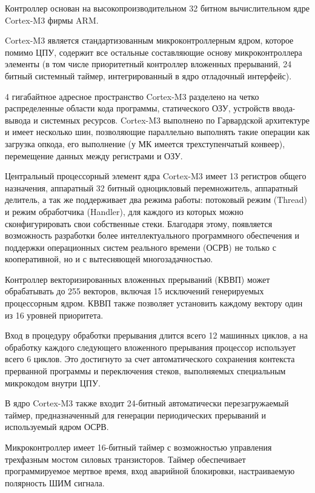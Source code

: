         Контроллер основан на высокопроизводительном 32 битном вычислительном
        ядре Cortex-M3 фирмы ARM.

        Cortex-M3 является стандартизованным микроконтроллерным ядром, которое
        помимо ЦПУ, содержит все остальные составляющие основу микроконтроллера
        элементы (в том числе приоритетный контроллер вложенных прерываний, 24
        битный системный таймер, интегрированный в ядро отладочный интерфейс). 

        4 гигабайтное адресное пространство Cortex-M3 разделено на четко
        распределенные области кода программы, статического ОЗУ, устройств
        ввода-вывода и системных ресурсов. Cortex-M3 выполнено по Гарвардской
        архитектуре и  имеет несколько шин, позволяющие параллельно выполнять
        такие операции как загрузка опкода, его выполнение (у МК имеется
        трехступенчатый конвеер), перемещение данных между регистрами и ОЗУ.

        Центральный процессорный элемент ядра Cortex-M3 имеет 13 регистров
        общего назначения, аппаратный 32 битный одноцикловый перемножитель,
        аппаратный делитель, а так же поддерживает два режима работы: потоковый
        режим (Thread) и режим обработчика (Handler), для каждого из которых
        можно сконфигурировать свои собственные стеки. Благодаря этому,
        появляется возможность разработки более интеллектуального программного
        обеспечения и поддержки операционных систем реального времени (ОСРВ) не
        только с кооперативной, но и с вытесняющей многозадачностью.

        Контроллер векторизированных вложенных прерываний (КВВП) может
        обрабатывать до 255 векторов, включая 15 исключений генерируемых
        процессорным ядром. КВВП также позволяет установить каждому вектору
        один из 16 уровней приоритета.

        Вход в процедуру обработки прерывания длится всего 12 машинных
        циклов, а на обработку каждого следующего вложенного прерывания
        процессор использует всего 6 циклов. Это достигнуто  за счет
        автоматического сохранения контекста прерванной программы и
        переключения стеков, выполняемых специальным микрокодом внутри ЦПУ.

        В ядро Cortex-M3 также входит 24-битный автоматически перезагружаемый
        таймер, предназначенный для генерации периодических прерываний и
        используемый ядром ОСРВ.

        Микроконтроллер имеет 16-битный таймер с возможностью управления
        трехфазным мостом силовых транзисторов. Таймер обеспечивает
        программируемое мертвое время, вход аварийной блокировки,
        настраиваемую полярность ШИМ сигнала.

